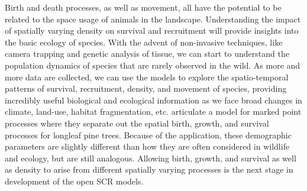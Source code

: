 Birth and death processes, as well as movement, all have the potential
to be related to the space usage of animals in the landscape.
Understanding the impact of spatially varying density on survival and
recruitment will provide insights into the basic ecology of species.
With the advent of non-invasive techniques, like camera trapping and
genetic analysis of tissue, we can start to understand the population
dynamics of species that are rarely observed in the wild.  As more and
more data are collected, we can use the models to explore the
spatio-temporal patterns of survival, recruitment, density, and
movement of species, providing incredibly useful biological and
ecological information as we face broad changes in climate, land-use,
habitat fragmentation, etc.  \citet{rathbun_cressie:1994} articulate a
model for marked point processes where they separate out the spatial
birth, growth, and survival processes for longleaf pine trees.
Because of the application, these demographic parameters are slightly
different than how they are often considered in wildlife and ecology,
but are still analogous.  Allowing birth, growth, and survival as well
as density to arise from different spatially varying processes is the
next stage in development of the open SCR models.


